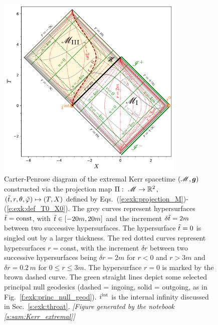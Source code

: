 \begin{figure}
\centerline{\includegraphics[width=0.8\textwidth]{exk_CPdiag_Kerr.pdf}}
\caption[]{\label{f:exk:CPdiag_Kerr} \footnotesize
Carter-Penrose diagram of the extremal Kerr spacetime $(\mathscr{M},\bm{g})$
constructed via the projection
map $\Pi:\ \mathscr{M} \to \mathbb{R}^2$,  $({\tilde t},r,\theta,{\tilde\varphi})\mapsto (T, X)$
defined by Eqs.~(\ref{e:exk:projection_M})-(\ref{e:exk:def_T0_X0}).
The grey curves represent hypersurfaces ${\tilde t}=\mathrm{const}$, with
${\tilde t}\in[-20 m, 20 m]$ and
the increment $\delta{\tilde t} = 2 m$ between two successive hypersurfaces.
The hypersurface ${\tilde t}=0$ is singled out by a larger thickness.
The red dotted curves represent hypersurfaces $r=\mathrm{const}$,
with the increment $\delta r$ between two successive hypersurfaces being
$\delta r = 2m$ for $r<0$ and $r> 3m$ and $\delta r = 0.2\, m$ for $0\leq r \leq 3m$.
The hypersurface $r=0$ is marked by the brown dashed curve.
The green straight lines depict some selected principal null geodesics
(dashed = ingoing, solid = outgoing, as in Fig.~\ref{f:exk:princ_null_geod}).
$i^{\rm int}$ is the internal infinity discussed in Sec.~\ref{s:exk:throat}.
\textsl{[Figure generated by the notebook \ref{s:sam:Kerr_extremal}]}
}
\end{figure}


